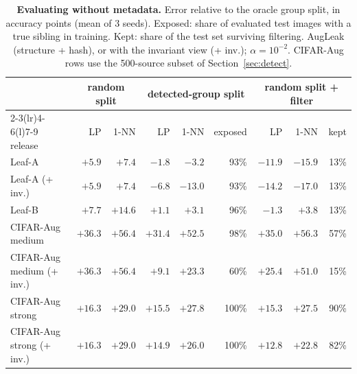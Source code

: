 \begin{table}[t]
\centering\small
\setlength{\tabcolsep}{4pt}
\caption{\textbf{Evaluating without metadata.} Error relative to the oracle group split, in accuracy points (mean of 3 seeds). Exposed: share of evaluated test images with a true sibling in training. Kept: share of the test set surviving filtering. AugLeak (structure + hash), or with the invariant view (+ inv.); $\alpha=10^{-2}$. CIFAR-Aug rows use the 500-source subset of Section~\ref{sec:detect}.}
\label{tab:protocol}
\begin{tabular}{@{}l rr rrr rrr@{}}
\toprule
 & \multicolumn{2}{c}{random split} & \multicolumn{3}{c}{detected-group split} & \multicolumn{3}{c}{random split + filter} \\
\cmidrule(lr){2-3}\cmidrule(lr){4-6}\cmidrule(l){7-9}
release & LP & 1-NN & LP & 1-NN & exposed & LP & 1-NN & kept \\
\midrule
Leaf-A & $+5.9$ & $+7.4$ & $-1.8$ & $-3.2$ & 93\% & $-11.9$ & $-15.9$ & 13\% \\
Leaf-A (+ inv.) & $+5.9$ & $+7.4$ & $-6.8$ & $-13.0$ & 93\% & $-14.2$ & $-17.0$ & 13\% \\
Leaf-B & $+7.7$ & $+14.6$ & $+1.1$ & $+3.1$ & 96\% & $-1.3$ & $+3.8$ & 13\% \\
CIFAR-Aug medium & $+36.3$ & $+56.4$ & $+31.4$ & $+52.5$ & 98\% & $+35.0$ & $+56.3$ & 57\% \\
CIFAR-Aug medium (+ inv.) & $+36.3$ & $+56.4$ & $+9.1$ & $+23.3$ & 60\% & $+25.4$ & $+51.0$ & 15\% \\
CIFAR-Aug strong & $+16.3$ & $+29.0$ & $+15.5$ & $+27.8$ & 100\% & $+15.3$ & $+27.5$ & 90\% \\
CIFAR-Aug strong (+ inv.) & $+16.3$ & $+29.0$ & $+14.9$ & $+26.0$ & 100\% & $+12.8$ & $+22.8$ & 82\% \\
\bottomrule
\end{tabular}
\end{table}
